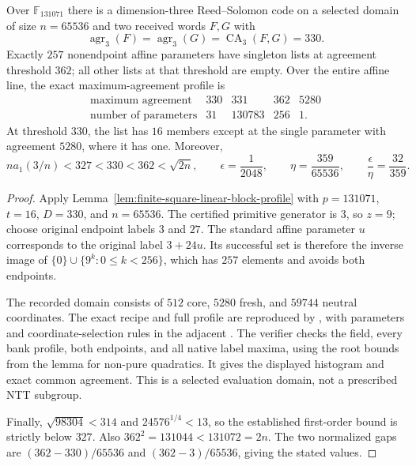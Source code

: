 \begin{corollary}
\label{cor:square-linear-block-bank-65536}
Over $\mathbb F_{131071}$ there is a dimension-three Reed--Solomon
code on a selected domain of size $n=65536$ and two received words
$F,G$ with
\[
 \operatorname{agr}_3(F)=\operatorname{agr}_3(G)
 =\operatorname{CA}_3(F,G)=330.
\]
Exactly $257$ nonendpoint affine parameters have singleton lists
at agreement threshold $362$; all other lists at that threshold
are empty.  Over the entire affine line, the exact maximum-agreement
profile is
\[
\begin{array}{c|rrrr}
 \text{maximum agreement}&330&331&362&5280\\ \hline
 \text{number of parameters}&31&130783&256&1.
\end{array}
\]
At threshold $330$, the list has $16$ members except at the single
parameter with agreement $5280$, where it has one.  Moreover,
\[
 n a_1(3/n)<327<330<362<\sqrt{2n},\qquad
 \epsilon=\frac1{2048},\qquad
 \eta=\frac{359}{65536},\qquad
 \frac\epsilon\eta=\frac{32}{359}.
\]
\end{corollary}
\begin{proof}
Apply Lemma~\ref{lem:finite-square-linear-block-profile} with
$p=131071$, $t=16$, $D=330$, and $n=65536$.
The certified primitive generator is $3$, so $z=9$; choose original
endpoint labels $3$ and $27$.  The standard affine parameter $u$
corresponds to the original label $3+24u$.  Its successful set is
therefore the inverse image of
$\{0\}\cup\{9^k:0\le k<256\}$, which has $257$ elements and
avoids both endpoints.

The recorded domain consists of $512$ core, $5280$ fresh, and
$59744$ neutral coordinates.  The exact recipe and full profile
are reproduced by
,
with parameters and coordinate-selection rules in the adjacent
.  The verifier checks the field, every bank
profile, both endpoints, and all native label maxima, using the
root bounds from the lemma for non-pure quadratics.  It gives the
displayed histogram and exact common agreement.  This is a
selected evaluation domain, not a prescribed NTT subgroup.

Finally, $\sqrt{98304}<314$ and $24576^{1/4}<13$, so the established
first-order bound is strictly below $327$.  Also
$362^2=131044<131072=2n$.  The two normalized gaps are
$(362-330)/65536$ and $(362-3)/65536$, giving the stated values.
\end{proof}
